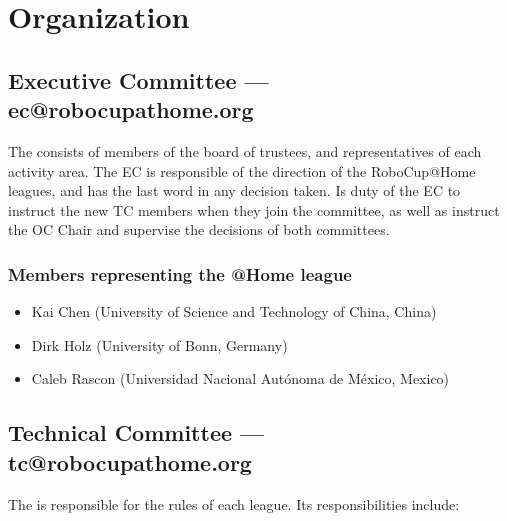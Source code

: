 \section{Organization}

%
%
\subsection{Executive Committee --- ec@robocupathome.org}
\label{sec:ec}
The  consists of members of the board of trustees, and representatives of each activity area. The EC is responsible of the direction of the RoboCup@Home leagues, and has the last word in any decision taken. Is duty of the EC to instruct the new TC members when they join the committee, as well as instruct the OC Chair and supervise the decisions of both committees.

\subsubsection{Members representing the @Home league}
\begin{itemize}
  \item Kai Chen (University of Science and Technology of China, China)
  \item Dirk Holz (University of Bonn, Germany)
  \item Caleb Rascon (Universidad Nacional Autónoma de México, Mexico)
\end{itemize}


%
%
\subsection{Technical Committee --- tc@robocupathome.org}
\label{sec:tc}
The  is responsible for the rules of each league. Its responsibilities include:

